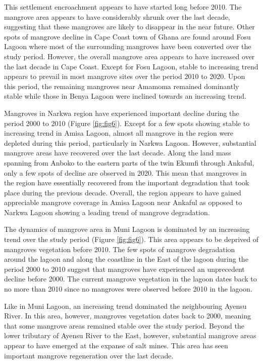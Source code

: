 \documentclass[12pt,oneside,preprint,3p,authoryear,times]{elsarticle} %
\begin{document}
This settlement encroachment appears to have started long before 2010.
The mangrove area appears to have considerably shrunk over the last
decade, suggesting that these mangroves are likely to disappear in the
near future. Other spots of mangrove decline in Cape Coast town of Ghana
are found around Fosu Lagoon where most of the surrounding mangroves
have been converted over the study period. However, the overall mangrove
area appears to have increased over the last decade in Cape Coast.
Except for Fosu Lagoon, stable to increasing trend appears to prevail in
most mangrove sites over the period 2010 to 2020. Upon this period, the
remaining mangroves near Amamoma remained dominantly stable while those
in Benya Lagoon were inclined towards an increasing trend.

Mangroves in Narkwa region have experienced important decline during the
period 2000 to 2010 (Figure \ref{fig:fig6}). Except for a few spots
showing stable to increasing trend in Amisa Lagoon, almost all mangrove
in the region were depleted during this period, particularly in Narkwa
Lagoon. However, substantial mangrove areas have recovered over the last
decade. Along the land mass spanning from Anboko to the eastern parts of
the twin Ekumfi through Ankaful, only a few spots of decline are
observed in 2020. This mean that mangroves in the region have
essentially recovered from the important degradation that took place
during the previous decade. Overall, the region appears to have gained
appreciable mangrove coverage in Amisa Lagoon near Ankaful as opposed to
Narkwa Lagoon showing a leading trend of mangrove degradation.

The dynamics of mangrove area in Muni Lagoon is dominated by an
increasing trend over the study period (Figure \ref{fig:fig6}). This
area appears to be deprived of mangroves vegetation before 2010. The few
spots of mangrove degradation around the lagoon and along the coastline
in the East of the lagoon during the period 2000 to 2010 suggest that
mangroves have experienced an unprecedent decline before 2000. The
current mangrove vegetation in the lagoon dates back to no more than
2010 since no mangroves were observed before 2010 in the lagoon.

Like in Muni Lagoon, an increasing trend dominated the neighbouring
Ayensu River. In this area, however, mangroves vegetation dates back to
2000, meaning that some mangrove areas remained stable over the study
period. Beyond the lower tributary of Ayensu River to the East, however,
substantial mangrove areas appear to have emerged at the expanse of salt
mines. This area has seen important mangrove regeneration over the last
decade.
\end{document}
